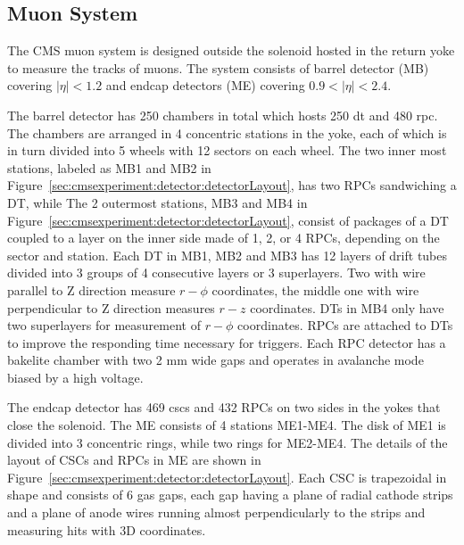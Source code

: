 \subsection{Muon System}
The CMS muon system \cite{cms:muonChamberTdr:CMS:1997iti} is designed outside the solenoid hosted in the return yoke to measure the tracks of muons. The system consists of barrel detector (MB) covering $|\eta|<1.2$ and endcap detectors (ME) covering $0.9 < |\eta| < 2.4$. 

The barrel detector has 250 chambers in total which hosts 250 \acrfull{dt} and 480 \acrfull{rpc}. The chambers are  arranged in 4 concentric stations in the yoke, each of which is in turn divided into 5 wheels with 12 sectors on each wheel. The two inner most stations, labeled as MB1 and MB2 in Figure~\ref{sec:cmsexperiment:detector:detectorLayout}, has two RPCs sandwiching a DT, while The 2 outermost stations, MB3 and MB4 in Figure~\ref{sec:cmsexperiment:detector:detectorLayout}, consist of packages of a DT coupled to a layer on the inner side made of 1, 2, or 4 RPCs, depending on the sector and station.
Each DT in MB1, MB2 and MB3 has 12 layers of drift tubes divided into 3 groups of 4 consecutive layers or 3 superlayers. Two with wire parallel to Z direction measure $r-\phi$ coordinates, the middle one with wire perpendicular to Z direction measures $r-z$ coordinates. DTs in MB4 only have two superlayers for measurement of $r-\phi$ coordinates. RPCs are attached to DTs to improve the responding time necessary for triggers. Each RPC detector has a bakelite chamber with two 2 mm wide gaps and operates in avalanche mode biased by a high voltage. 

The endcap detector has 469 \acrfull{csc}s and 432 RPCs on two sides in the yokes that close the solenoid. The ME consists of 4 stations ME1-ME4. The disk of ME1 is divided into 3 concentric rings, while two rings for ME2-ME4. The details of the layout of CSCs and RPCs in ME are shown in Figure~\ref{sec:cmsexperiment:detector:detectorLayout}. Each CSC is trapezoidal in shape and consists of 6 gas gaps, each gap having a plane of radial cathode strips and a plane of anode wires running almost perpendicularly to the strips and measuring hits with 3D coordinates.

